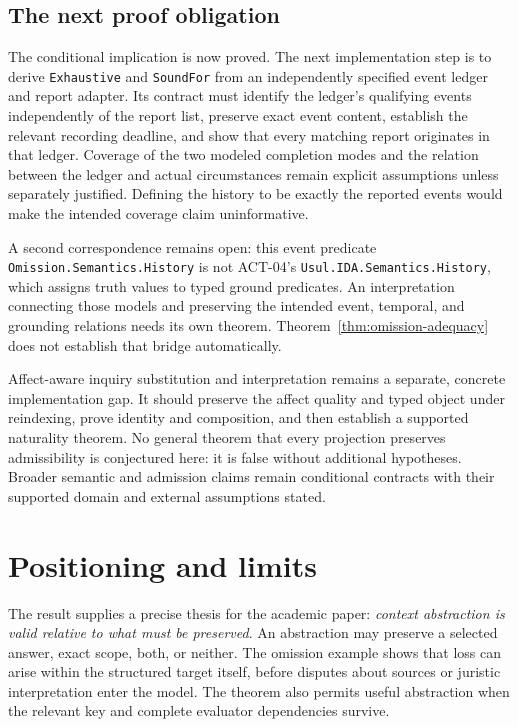 \documentclass[11pt]{article}
\begin{document}
\subsection{The next proof obligation}

The conditional implication is now proved. The next implementation step is to derive \texttt{Exhaustive} and \texttt{SoundFor} from an independently specified event ledger and report adapter. Its contract must identify the ledger's qualifying events independently of the report list, preserve exact event content, establish the relevant recording deadline, and show that every matching report originates in that ledger. Coverage of the two modeled completion modes and the relation between the ledger and actual circumstances remain explicit assumptions unless separately justified. Defining the history to be exactly the reported events would make the intended coverage claim uninformative.

A second correspondence remains open: this event predicate \texttt{Omission.\allowbreak{}Semantics.\allowbreak{}History} is not ACT-04's \texttt{Usul.\allowbreak{}IDA.\allowbreak{}Semantics.\allowbreak{}History}, which assigns truth values to typed ground predicates. An interpretation connecting those models and preserving the intended event, temporal, and grounding relations needs its own theorem. Theorem~\ref{thm:omission-adequacy} does not establish that bridge automatically.

Affect-aware inquiry substitution and interpretation remains a separate, concrete implementation gap. It should preserve the affect quality and typed object under reindexing, prove identity and composition, and then establish a supported naturality theorem. No general theorem that every projection preserves admissibility is conjectured here: it is false without additional hypotheses. Broader semantic and admission claims remain conditional contracts with their supported domain and external assumptions stated.

\section{Positioning and limits}

The result supplies a precise thesis for the academic paper: \emph{context abstraction is valid relative to what must be preserved}. An abstraction may preserve a selected answer, exact scope, both, or neither. The omission example shows that loss can arise within the structured target itself, before disputes about sources or juristic interpretation enter the model. The theorem also permits useful abstraction when the relevant key and complete evaluator dependencies survive.
\end{document}
